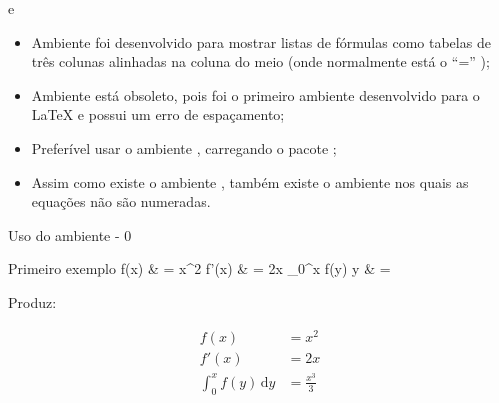 \begin{frame}{ e }
	\begin{itemize}
		\item Ambiente  foi desenvolvido para mostrar listas de fórmulas como tabelas de três colunas alinhadas na coluna do meio (onde normalmente está o ``='' );
		\pause
		\item Ambiente  está obsoleto, pois foi o primeiro ambiente desenvolvido para o \LaTeX{} e possui um erro de espaçamento;
		\pause
		\item Preferível usar o ambiente , carregando o pacote ;
		\pause
		\item Assim como existe o ambiente , também existe o ambiente   nos quais  as equações não são numeradas.
	\end{itemize}
\end{frame}

\begin{frame}{Uso do ambiente  - 0}
	\begin{Codigo}{Primeiro exemplo}
		\n
			f(x) \& =  x\string^2 \LCmd{\bs}\n
			f'(x) \& =  2x \LCmd{\bs}\n
			\string_0\string^x f(y)\LCmd{,}					y \& = 
	\end{Codigo}

    \pause
	Produz:
	
	\begin{Resultado}{}
		\begin{align}
			f(x) & = x^2 \\
			f'(x) & = 2x \\
			\int_0^x f(y)\,\mathrm{d}y & =  \frac{x^3}{3}
		\end{align}
	\end{Resultado}
\end{frame}

